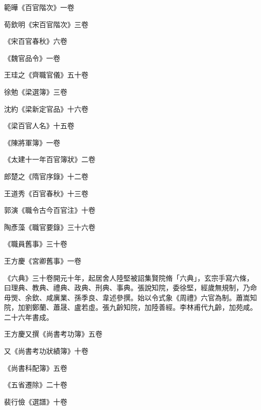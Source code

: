 \begin{pinyinscope}
 範曄《百官階次》一卷



 荀欽明《宋百官階次》三卷



 《宋百官春秋》六卷



 《魏官品令》一卷



 王珪之《齊職官儀》五十卷



 徐勉《梁選簿》三卷



 沈約《梁新定官品》十六卷



 《梁百官人名》十五卷



 《陳將軍簿》一卷



 《太建十一年百官簿狀》二卷



 郎楚之《隋官序錄》十二卷



 王道秀《百官春秋》十三卷



 郭演《職令古今百官注》十卷



 陶彥藻《職官要錄》三十六卷



 《職員舊事》三十卷



 王方慶《宮卿舊事》一卷



 《六典》三十卷開元十年，起居舍人陸堅被詔集賢院脩「六典」，玄宗手寫六條，曰理典、教典、禮典、政典、刑典、事典。張說知院，委徐堅，經歲無規制，乃命毋煚、余欽、咸廙業、孫季良、韋述參撰。始以令式象《周禮》六官為制。蕭嵩知院，加劉鄭蘭、蕭晟、盧若虛。張九齡知院，加陸善經。李林甫代九齡，加苑咸。二十六年書成。



 王方慶又撰《尚書考功簿》五卷



 又《尚書考功狀績簿》十卷



 《尚書科配簿》五卷



 《五省遷除》二十卷



 裴行儉《選譜》十卷




\end{pinyinscope}
